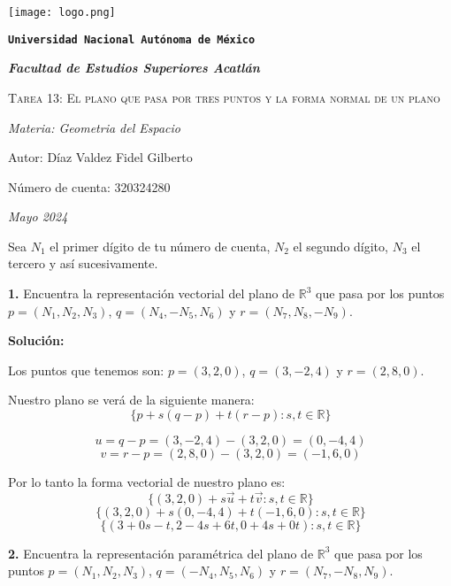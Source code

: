 \documentclass{article}
\begin{document}
\begin{titlepage}
    \centering   
    {\texttt{[image: logo.png]}\par}
    {\texttt{\bfseries \LARGE Universidad Nacional Autónoma de México} \par}
    \vspace{1cm}
    {\itshape \Large \bfseries Facultad de Estudios Superiores Acatlán \par}
    \vspace{3cm}
    {\scshape \Huge Tarea 13: El plano que pasa por tres puntos y la forma normal de un plano\par}
    \vspace {3cm}
    {\slshape \Large Materia: Geometria del Espacio \par}
    \vspace{2cm}
    {\Large Autor: Díaz Valdez Fidel Gilberto\par}
    {\Large Número de cuenta: 320324280\par}
    \vfill
    {\itshape Mayo 2024 \par}
\end{titlepage}
Sea $N_1$ el primer dígito de tu número de cuenta, $N_2$ el segundo dígito, $N_3$ el tercero y así
sucesivamente.
\vspace{10pt}

\textbf{1.} Encuentra la representación vectorial del plano de $\mathbb{R}^3$ que pasa por los puntos $p = (N_1,N_2,N_3)$, $q = (N_4,-N_5,N_6)$ y $r = (N_7,N_8,-N_9)$.
\vspace{10pt}

\textbf{Solución:}
\vspace{10pt}

Los puntos que tenemos son: $p = (3,2,0)$, $q = (3,-2,4)$ y $r = (2,8,0)$.

Nuestro plano se verá de la siguiente manera: 
$$\{p +s(q-p) +t(r-p): s,t \in \mathbb{R}\}$$

$$u =q -p = (3,-2,4) - (3,2,0) =(0, -4, 4)$$
$$v = r-p=(2,8,0) - (3,2,0) = (-1,6,0)$$

Por lo tanto la forma vectorial de nuestro plano es:
$$\{(3,2,0)+ s\vec{u} +t\vec{v}: s,t \in \mathbb{R}\}$$
$$\{(3,2,0)+ s(0,-4,4) +t(-1,6,0): s,t \in \mathbb{R}\}$$
$$\{(3+0s-t, 2-4s+6t, 0+4s+0t): s,t \in \mathbb{R}\}$$
\vspace*{10pt}

\textbf{2.} Encuentra la representación paramétrica del plano de $\mathbb{R}^3$ que pasa por los puntos $p = (N_1,N_2,N_3)$, $q = (-N_4,N_5,N_6)$ y $r = (N_7,-N_8,N_9)$.
\vspace{10pt}
\end{document}

